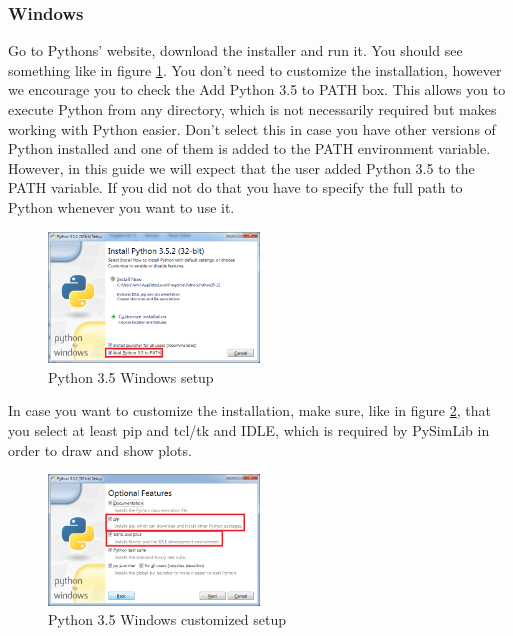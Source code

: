 \subsubsection{Windows}

Go to Pythons' website, download the installer and run it.
You should see something like in figure \ref{pythonSetup1}.
You don't need to customize the installation, however we encourage you to check the \grqq{}Add Python 3.5 to PATH\grqq{} box.
This allows you to execute Python from any directory, which is not necessarily required but makes working with Python easier.
Don't select this in case you have other versions of Python installed and one of them is added to the PATH environment variable.
However, in this guide we will expect that the user added Python 3.5 to the PATH variable.
If you did not do that you have to specify the full path to Python whenever you want to use it.

\begin{figure}[h]
	\centering
	\includegraphics[width=0.5\textwidth]{images/python_setup1.png}
	\caption{Python 3.5 Windows setup}
	\label{pythonSetup1}
\end{figure}


In case you want to customize the installation, make sure, like in figure \ref{pythonSetup2}, that you select at least \grqq{}pip\grqq{} and \grqq{}tcl/tk and IDLE\grqq{}, which is required by PySimLib in order to draw and show plots.

\begin{figure}[H]
	\centering
	\includegraphics[width=0.5\textwidth]{images/python_setup2.png}
	\caption{Python 3.5 Windows customized setup}
	\label{pythonSetup2}
\end{figure}





